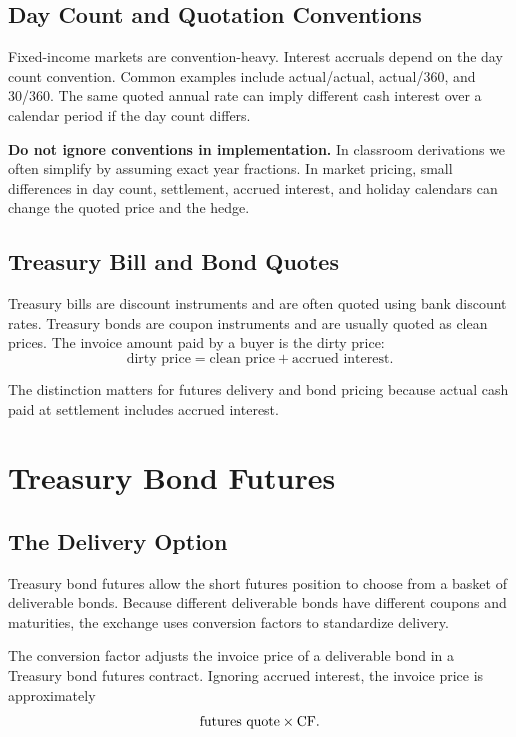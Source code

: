 \subsection{Day Count and Quotation Conventions}

Fixed-income markets are convention-heavy. Interest accruals depend on the day
count convention. Common examples include actual/actual, actual/360, and
30/360. The same quoted annual rate can imply different cash interest over a
calendar period if the day count differs.

\begin{boxF}
\textbf{Do not ignore conventions in implementation.} In classroom derivations
we often simplify by assuming exact year fractions. In market pricing, small
differences in day count, settlement, accrued interest, and holiday calendars
can change the quoted price and the hedge.
\end{boxF}

\subsection{Treasury Bill and Bond Quotes}

Treasury bills are discount instruments and are often quoted using bank discount
rates. Treasury bonds are coupon instruments and are usually quoted as clean
prices. The invoice amount paid by a buyer is the dirty price:
\[
    \text{dirty price}=\text{clean price}+\text{accrued interest}.
\]

The distinction matters for futures delivery and bond pricing because actual
cash paid at settlement includes accrued interest.

\section{Treasury Bond Futures}

\subsection{The Delivery Option}

Treasury bond futures allow the short futures position to choose from a basket
of deliverable bonds. Because different deliverable bonds have different
coupons and maturities, the exchange uses conversion factors to standardize
delivery.

\begin{defN}
The conversion factor adjusts the invoice price of a deliverable bond in a
Treasury bond futures contract. Ignoring accrued interest, the invoice price is
approximately
\[
    \text{futures quote}\times \mathrm{CF}.
\]
\end{defN}

